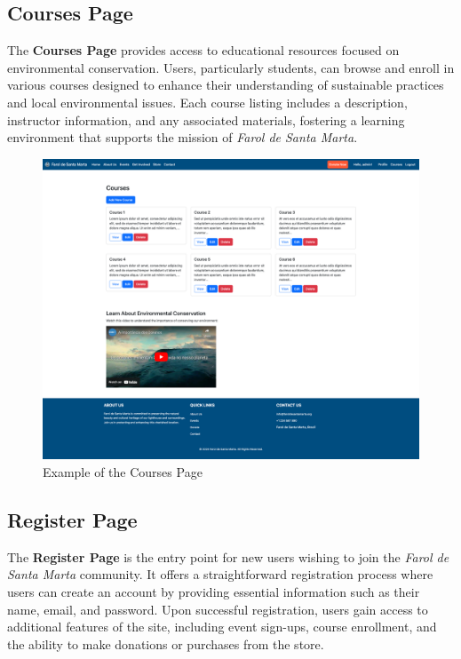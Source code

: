 \subsection{Courses Page}

The \textbf{Courses Page} provides access to educational resources focused on environmental conservation. Users, particularly students, can browse and enroll in various courses designed to enhance their understanding of sustainable practices and local environmental issues. Each course listing includes a description, instructor information, and any associated materials, fostering a learning environment that supports the mission of \textit{Farol de Santa Marta}.

\begin{figure}[H]
    \centering
    \includegraphics[width=\textwidth]{images/courses-page.png}
    \caption{Example of the Courses Page}
    \label{fig:courses_page}
\end{figure}

\subsection{Register Page}

The \textbf{Register Page} is the entry point for new users wishing to join the \textit{Farol de Santa Marta} community. It offers a straightforward registration process where users can create an account by providing essential information such as their name, email, and password. Upon successful registration, users gain access to additional features of the site, including event sign-ups, course enrollment, and the ability to make donations or purchases from the store.

